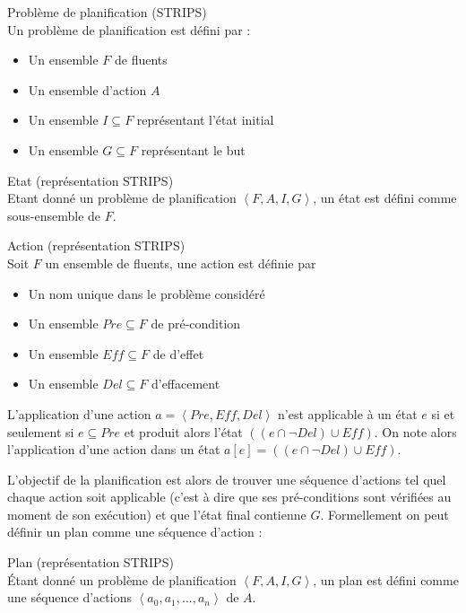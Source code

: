 \begin{definition}Problème de planification (STRIPS)\\
	\label{def:prb_strips}Un problème de planification est défini par :
	\begin{itemize}
		\item Un ensemble $F$ de fluents
		\item Un ensemble d'action $A$
		\item Un ensemble $I \subseteq F$ représentant l'état initial
		\item Un ensemble $G \subseteq F$ représentant le but
	\end{itemize}
\end{definition}

\begin{definition}Etat (représentation STRIPS)\\
	\label{def:etat_strips}
	Etant donné un problème de planification $\left<F,A,I,G\right>$, un état est défini comme sous-ensemble de $F$.
\end{definition}

\begin{definition}Action (représentation STRIPS)\\
	\label{def:action_strips}Soit $F$ un ensemble de fluents, une action est définie par
	\begin{itemize}
		\item Un nom unique dans le problème considéré
		\item Un ensemble $Pre \subseteq F$ de pré-condition
		\item Un ensemble $Eff \subseteq F$ de d'effet
		\item Un ensemble $Del \subseteq F$ d'effacement
	\end{itemize}
\end{definition}

L'application d'une action $a = \left<Pre, Eff, Del\right>$ n'est applicable à un état $e$ si et seulement si $e \subseteq Pre$ et produit alors l'état $((e \cap \neg Del) \cup Eff)$. On note alors l'application d'une action dans un état $a[e] = ((e \cap \neg Del) \cup Eff)$.

L'objectif de la planification est alors de trouver une séquence d'actions tel quel chaque action soit applicable (c'est à dire que ses pré-conditions sont vérifiées au moment de son exécution) et que l'état final contienne $G$. Formellement on peut définir un plan comme une séquence d'action :

\begin{definition}Plan (représentation STRIPS)\\
	\label{def:plan_strips}Étant donné un problème de planification $\left<F,A,I,G\right>$, un plan est défini comme une séquence d'actions $\left<a_0, a_1, ..., a_n \right>$ de $A$. 
\end{definition}

